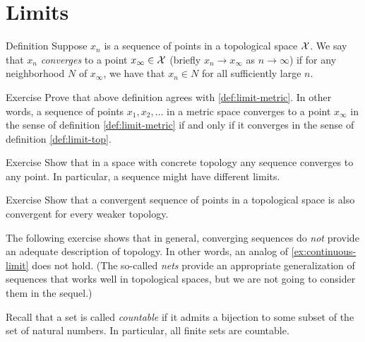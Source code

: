 \section{Limits}

\begin{thm}{Definition}\label{def:limit-top}
Suppose $x_n$ is a sequence of points in a topological space $\mathcal{X}$.
We say that $x_n$ \emph{converges} to a point $x_\infty\in \mathcal{X}$ (briefly $x_n\to x_\infty$ as $n\to\infty$) if for any neighborhood $N$ of $x_\infty$, we have that 
$x_n\in N$ for all sufficiently large $n$.
\end{thm}

\begin{thm}{Exercise}\label{ex:def:limit-metric=def:limit-top}
Prove that above definition agrees with \ref{def:limit-metric}.
In other words, a sequence of points $x_1,x_2,\dots$ in a metric space converges to a point $x_\infty$ in the sense of definition \ref{def:limit-metric} if and only if it converges in the sense of definition \ref{def:limit-top}.
\end{thm}

\begin{thm}{Exercise}\label{ex:concrete-lim}
Show that in a space with concrete topology any sequence converges to any point.
In particular, a sequence might have different limits.
\end{thm}

\begin{thm}{Exercise}\label{ex:lim-weaker}
Show that a convergent sequence of points in a topological space is also convergent for every weaker topology.
\end{thm}

The following exercise shows that in general, converging sequences do \textit{not} provide an adequate description of topology.
In other words, an analog of \ref{ex:continuous-limit} does not hold.%
(The so-called \emph{nets} provide an appropriate generalization of sequences that works well in topological spaces, but we are not going to consider them in the sequel.)

Recall that a set is called \emph{countable} if it admits a bijection to some subset of the set of natural numbers.
In particular, all finite sets are countable.

